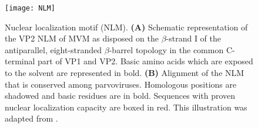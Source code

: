 \begin{figure}
\centering
  \texttt{[image: NLM]}
  \caption[Nuclear localisation motif (NLM)]
   {Nuclear localization motif (NLM). \textbf{(A)} Schematic representation of the VP2 NLM of MVM as disposed on the $\beta$-strand I of the antiparallel, eight-stranded $\beta$-barrel topology in the common C-terminal part of VP1 and VP2. Basic amino acids which are exposed to the solvent are represented in bold. \textbf{(B)} Alignment of the NLM that is conserved among parvoviruses. Homologous positions are shadowed and basic residues are in bold. Sequences with proven nuclear localization capacity are boxed in red. This illustration was adapted from \cite{pmid10729155, almendral}.} 
\label{NLM}
\end{figure}


